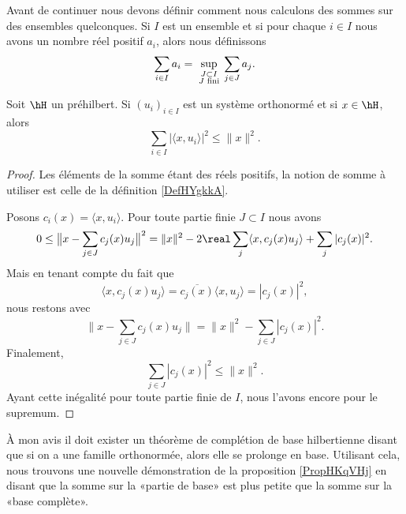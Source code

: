 Avant de continuer nous devons définir comment nous calculons des sommes sur des ensembles quelconques. Si \( I\) est un ensemble et si pour chaque \( i\in I\) nous avons un nombre réel positif \( a_i\), alors nous définissons
\begin{equation}
    \sum_{i\in I}a_i=\sup_{\substack{J\subset I\\\text{ \( J\) fini }}}\sum_{j\in J} a_j.
\end{equation}

\begin{proposition}    \label{PropHKqVHj}
    Soit \( \hH\) un préhilbert. Si \( (u_i)_{i\in I}\) est un système orthonormé et si \( x\in \hH\), alors
    \begin{equation}
        \sum_{i\in I}\big| \langle x, u_i\rangle  \big|^2\leq \| x \|^2.
    \end{equation}
\end{proposition}

\begin{proof}
    Les éléments de la somme étant des réels positifs, la notion de somme à utiliser est celle de la définition \ref{DefHYgkkA}.

    Posons \( c_i(x)=\langle x, u_i\rangle \). Pour toute partie finie \( J\subset I\) nous avons
    \begin{equation}
        0\leq \big\| x-\sum_{j\in J}c_j(x)u_j \big\|^2=\| x \|^2-2\real\sum_{j}\langle x, c_j(x)u_j\rangle +\sum_j| c_j(x) |^2.
    \end{equation}
    Mais en tenant compte du fait que 
    \begin{equation}
        \langle x, c_j(x)u_j\rangle =\overline{  c_j(x)}\langle x, u_j\rangle =| c_j(x) |^2,
    \end{equation}
    nous restons avec
    \begin{equation}    \label{EqvwXWEA}
        \| x-\sum_{j\in J}c_j(x)u_j \|=\| x \|^2-\sum_{j\in J}| c_j(x) |^2.
    \end{equation}
    Finalement,
    \begin{equation}
        \sum_{j\in J}| c_j(x) |^2\leq \| x \|^2.
    \end{equation}
    Ayant cette inégalité pour toute partie finie de \( I\), nous l'avons encore pour le supremum.
\end{proof}

\begin{remark}  \label{RemfdJcQF}
    À mon avis il doit exister un théorème de complétion de base hilbertienne disant que si on a une famille orthonormée, alors elle se prolonge en base. Utilisant cela, nous trouvons une nouvelle démonstration de la proposition \ref{PropHKqVHj} en disant que la somme sur la «partie de base» est plus petite que la somme sur la «base complète».
\end{remark}

